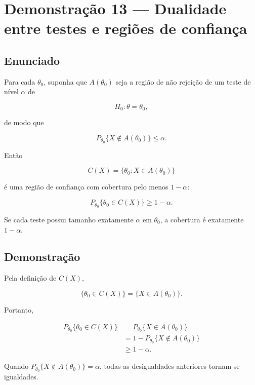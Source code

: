 \documentclass[
  letterpaper,
  DIV=11,
  numbers=noendperiod]{scrreprt}
\begin{document}
\section*{Demonstração 13 --- Dualidade entre testes e regiões de
confiança}\label{demonstrauxe7uxe3o-13-dualidade-entre-testes-e-regiuxf5es-de-confianuxe7a}


\subsection*{Enunciado}\label{enunciado-18}

Para cada \(\theta_0\), suponha que \(A(\theta_0)\) seja a região de não
rejeição de um teste de nível \(\alpha\) de

\[
H_0:\theta=\theta_0,
\]

de modo que

\[
P_{\theta_0}\{X\notin A(\theta_0)\}\leq\alpha.
\]

Então

\[
C(X)=\{\theta_0:X\in A(\theta_0)\}
\]

é uma região de confiança com cobertura pelo menos \(1-\alpha\):

\[
P_{\theta_0}\{\theta_0\in C(X)\}\geq1-\alpha.
\]

Se cada teste possui tamanho exatamente \(\alpha\) em \(\theta_0\), a
cobertura é exatamente \(1-\alpha\).

\subsection*{Demonstração}\label{demonstrauxe7uxe3o-19}

Pela definição de \(C(X)\),

\[
\{\theta_0\in C(X)\}
=
\{X\in A(\theta_0)\}.
\]

Portanto,

\[
\begin{aligned}
P_{\theta_0}\{\theta_0\in C(X)\}
&=P_{\theta_0}\{X\in A(\theta_0)\}\\
&=1-P_{\theta_0}\{X\notin A(\theta_0)\}\\
&\geq1-\alpha.
\end{aligned}
\]

Quando \(P_{\theta_0}\{X\notin A(\theta_0)\}=\alpha\), todas as
desigualdades anteriores tornam-se igualdades.
\end{document}
